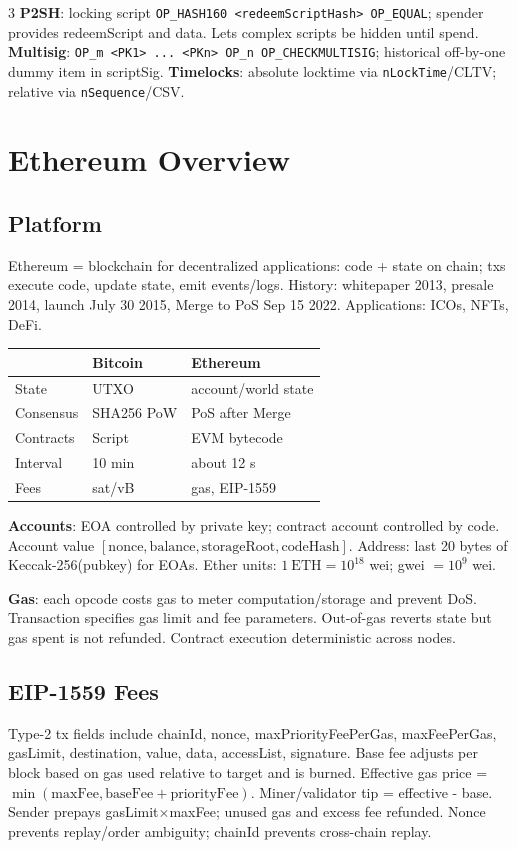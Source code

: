 \documentclass[8pt]{extarticle}
\newcommand{\term}[1]{\textbf{#1}}
\begin{document}
\begin{multicols*}{3}
\term{P2SH}: locking script \texttt{OP\_HASH160 <redeemScriptHash> OP\_EQUAL}; spender provides redeemScript and data. Lets complex scripts be hidden until spend. \term{Multisig}: \texttt{OP\_m <PK1> ... <PKn> OP\_n OP\_CHECKMULTISIG}; historical off-by-one dummy item in scriptSig. \term{Timelocks}: absolute locktime via \texttt{nLockTime}/CLTV; relative via \texttt{nSequence}/CSV.

\section{Ethereum Overview}
\subsection{Platform}
Ethereum = blockchain for decentralized applications: code + state on chain; txs execute code, update state, emit events/logs. History: whitepaper 2013, presale 2014, launch July 30 2015, Merge to PoS Sep 15 2022. Applications: ICOs, NFTs, DeFi.

\begin{tabularx}{\linewidth}{@{}lXX@{}}
\toprule
 & Bitcoin & Ethereum\\
\midrule
State & UTXO & account/world state\\
Consensus & SHA256 PoW & PoS after Merge\\
Contracts & Script & EVM bytecode\\
Interval & 10 min & about 12 s\\
Fees & sat/vB & gas, EIP-1559\\
\bottomrule
\end{tabularx}

\term{Accounts}: EOA controlled by private key; contract account controlled by code. Account value $[\mathrm{nonce},\mathrm{balance},\mathrm{storageRoot},\mathrm{codeHash}]$. Address: last 20 bytes of Keccak-256(pubkey) for EOAs. Ether units: $1\ \mathrm{ETH}=10^{18}$ wei; gwei $=10^9$ wei.

\term{Gas}: each opcode costs gas to meter computation/storage and prevent DoS. Transaction specifies gas limit and fee parameters. Out-of-gas reverts state but gas spent is not refunded. Contract execution deterministic across nodes.

\subsection{EIP-1559 Fees}
Type-2 tx fields include chainId, nonce, maxPriorityFeePerGas, maxFeePerGas, gasLimit, destination, value, data, accessList, signature. Base fee adjusts per block based on gas used relative to target and is burned. Effective gas price = $\min(\text{maxFee},\text{baseFee}+\text{priorityFee})$. Miner/validator tip = effective - base. Sender prepays gasLimit$\times$maxFee; unused gas and excess fee refunded. Nonce prevents replay/order ambiguity; chainId prevents cross-chain replay.


\end{multicols*}
\end{document}
